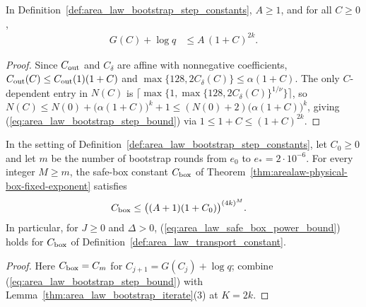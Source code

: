 \begin{lemma}
    \label{thm:area_law_bootstrap_step_bound}
    \leanok
    In Definition~\ref{def:area_law_bootstrap_step_constants}, $A\ge1$, and for all $C\ge0$,
    \begin{align}
        G(C)+\log q & \le A\,(1+C)^{2k}.
        \label{eq:area_law_bootstrap_step_bound}
    \end{align}
\end{lemma}
\begin{proof}
    \leanok
    Since $C_{\rm out}$ and $C_\delta$ are affine with nonnegative coefficients, $C_{\rm out}(C)\le C_{\rm out}(1)(1+C)$ and $\max\{128,2C_\delta(C)\}\le\alpha(1+C)$. The only $C$-dependent entry in $N(C)$ is $\bigl\lceil\max\bigl\{1,\max\{128,2C_\delta(C)\}^{1/\nu}\bigr\}\bigr\rceil$, so
    $N(C)\le N(0)+\bigl(\alpha(1+C)\bigr)^k+1\le(N(0)+2)\bigl(\alpha(1+C)\bigr)^k$,
    giving (\ref{eq:area_law_bootstrap_step_bound}) via $1\le1+C\le(1+C)^{2k}$.
\end{proof}

\begin{lemma}
    \label{thm:area_law_safe_box_power_bound}
    \leanok
    In the setting of Definition~\ref{def:area_law_bootstrap_step_constants}, let $C_0\ge0$ and let $m$ be the number of bootstrap rounds from $e_0$ to $e_*=2\cdot10^{-6}$. For every integer $M\ge m$, the safe-box constant $C_{\rm box}$ of Theorem~\ref{thm:arealaw-physical-box-fixed-exponent} satisfies
    \begin{align}
        C_{\rm box} & \le\bigl((A+1)(1+C_0)\bigr)^{(4k)^M}.
        \label{eq:area_law_safe_box_power_bound}
    \end{align}
    In particular, for $J\ge0$ and $\Delta>0$, (\ref{eq:area_law_safe_box_power_bound}) holds for $C_{\rm box}$ of Definition~\ref{def:area_law_transport_constant}.
\end{lemma}
\begin{proof}
    \leanok
    Here $C_{\rm box}=C_m$ for $C_{j+1}=G(C_j)+\log q$; combine (\ref{eq:area_law_bootstrap_step_bound}) with Lemma~\ref{thm:area_law_bootstrap_iterate}(3) at $K=2k$.
\end{proof}


